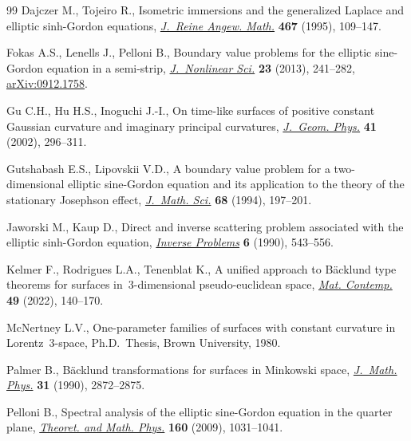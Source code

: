 \documentclass[pdftex]{sigma}
\numberwithin{equation}{section}
\begin{document}
\begin{thebibliography}{99}
Dajczer M., Tojeiro R., Isometric immersions and the generalized {L}aplace and
 elliptic sinh-{G}ordon equations, \href{https://doi.org/10.1515/crll.1995.467.109}{\textit{J.~Reine Angew. Math.}} \textbf{467}
 (1995), 109--147.

Fokas A.S., Lenells J., Pelloni B., Boundary value problems for the elliptic
 sine-{G}ordon equation in a semi-strip, \href{https://doi.org/10.1007/s00332-012-9150-5}{\textit{J.~Nonlinear Sci.}}
 \textbf{23} (2013), 241--282, \href{https://arxiv.org/abs/0912.1758}{arXiv:0912.1758}.

Gu C.H., Hu H.S., Inoguchi J.-I., On time-like surfaces of positive constant
 {G}aussian curvature and imaginary principal curvatures, \href{https://doi.org/10.1016/S0393-0440(01)00066-3}{\textit{J.~Geom.
 Phys.}} \textbf{41} (2002), 296--311.

Gutshabash E.S., Lipovskii V.D., A boundary value problem for a
 two-dimensional elliptic sine-{G}ordon equation and its application to the
 theory of the stationary {J}osephson effect, \href{https://doi.org/10.1007/BF01249332}{\textit{J.~Math. Sci.}}
 \textbf{68} (1994), 197--201.

Jaworski M., Kaup D., Direct and inverse scattering problem associated with the
 elliptic sinh-{G}ordon equation, \href{https://doi.org/10.1088/0266-5611/6/4/006}{\textit{Inverse Problems}} \textbf{6} (1990),
 543--556.

Kelmer F., Rodrigues L.A., Tenenblat K., A unified approach to {B}\"acklund
 type theorems for surfaces in~{3}-dimensional pseudo-euclidean space,
 \href{https://doi.org/10.21711/231766362022/rmc495}{\textit{Mat. Contemp.}} \textbf{49} (2022), 140--170.

McNertney L.V., One-parameter families of surfaces with constant curvature in
 {L}orentz~{3}-space, Ph.D.~Thesis, {B}rown {U}niversity, 1980.

Palmer B., B\"acklund transformations for surfaces in {M}inkowski space,
 \href{https://doi.org/10.1063/1.528939}{\textit{J.~Math. Phys.}} \textbf{31} (1990), 2872--2875.

Pelloni B., Spectral analysis of the elliptic sine-{G}ordon equation in the
 quarter plane, \href{https://doi.org/10.1007/s11232-009-0094-3}{\textit{Theoret. and Math. Phys.}} \textbf{160} (2009),
 1031--1041.


\end{thebibliography}
\end{document}
